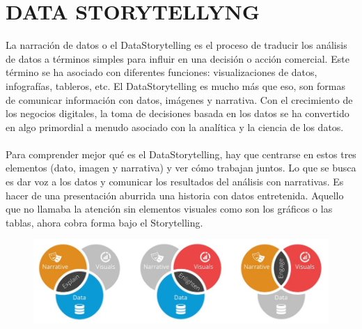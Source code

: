 {{\section{DATA STORYTELLYNG}
\item{La narración de datos o el DataStorytelling es el proceso de traducir los análisis de datos a términos simples para influir en una decisión o acción comercial. Este término se ha asociado con diferentes funciones: visualizaciones de datos, infografías, tableros, etc. El DataStorytelling es mucho más que eso, son formas de comunicar información con datos, imágenes y narrativa. Con el crecimiento de los negocios digitales, la toma de decisiones basada en los datos se ha convertido en algo primordial a menudo asociado con la analítica y la ciencia de los datos.\\\\
Para comprender mejor qué es el DataStorytelling, hay que centrarse en estos tres elementos (dato, imagen y narrativa) y ver cómo trabajan juntos. Lo que se busca es dar voz a los datos y comunicar los resultados del análisis con narrativas. Es hacer de una presentación aburrida una historia con datos entretenida. Aquello que no llamaba la atención sin elementos visuales como son los  gráficos o las tablas, ahora cobra forma bajo el Storytelling.}
\begin{figure}[htb]
\begin{center}
\includegraphics[width=15cm]{./Imagenes/imagen1}
\end{center}
\end{figure}

}}
